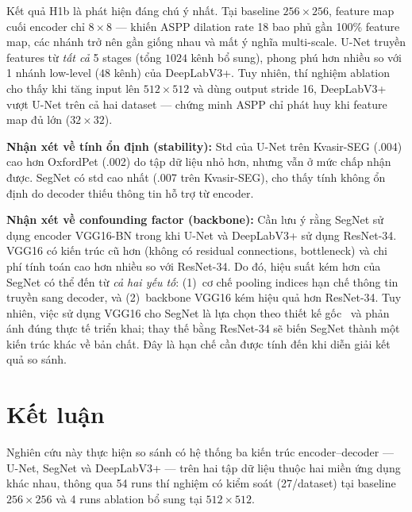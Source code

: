 \documentclass{article}
\begin{document}
Kết quả H1b là phát hiện đáng chú ý nhất.
Tại baseline $256{\times}256$, feature map cuối encoder chỉ $8{\times}8$ --- khiến ASPP dilation rate 18 bao phủ gần 100\% feature map, các nhánh trở nên gần giống nhau và mất ý nghĩa multi-scale.
U-Net truyền features từ \emph{tất cả} 5 stages (tổng $1024$ kênh bổ sung), phong phú hơn nhiều so với 1 nhánh low-level ($48$ kênh) của DeepLabV3+.
Tuy nhiên, thí nghiệm ablation cho thấy khi tăng input lên $512{\times}512$ và dùng output stride 16, DeepLabV3+ vượt U-Net trên cả hai dataset --- chứng minh ASPP chỉ phát huy khi feature map đủ lớn ($32{\times}32$).

\textbf{Nhận xét về tính ổn định (stability):}
Std của U-Net trên Kvasir-SEG (.004) cao hơn OxfordPet (.002) do tập dữ liệu nhỏ hơn, nhưng vẫn ở mức chấp nhận được.
SegNet có std cao nhất (.007 trên Kvasir-SEG), cho thấy tính không ổn định do decoder thiếu thông tin hỗ trợ từ encoder.

\textbf{Nhận xét về confounding factor (backbone):}
Cần lưu ý rằng SegNet sử dụng encoder VGG16-BN trong khi U-Net và DeepLabV3+ sử dụng ResNet-34.
VGG16 có kiến trúc cũ hơn (không có residual connections, bottleneck) và chi phí tính toán cao hơn nhiều so với ResNet-34.
Do đó, hiệu suất kém hơn của SegNet có thể đến từ \emph{cả hai yếu tố}: (1)~cơ chế pooling indices hạn chế thông tin truyền sang decoder, và (2)~backbone VGG16 kém hiệu quả hơn ResNet-34.
Tuy nhiên, việc sử dụng VGG16 cho SegNet là lựa chọn theo thiết kế gốc~\cite{badrinarayanan2017segnet} và phản ánh đúng thực tế triển khai; thay thế bằng ResNet-34 sẽ biến SegNet thành một kiến trúc khác về bản chất.
Đây là hạn chế cần được tính đến khi diễn giải kết quả so sánh.

\section{Kết luận}
\label{sec:conclu}

Nghiên cứu này thực hiện so sánh có hệ thống ba kiến trúc encoder--decoder --- U-Net, SegNet và DeepLabV3+ --- trên hai tập dữ liệu thuộc hai miền ứng dụng khác nhau, thông qua 54 runs thí nghiệm có kiểm soát (27/dataset) tại baseline $256{\times}256$ và 4 runs ablation bổ sung tại $512{\times}512$.
\end{document}
